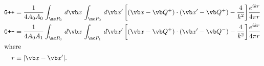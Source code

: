 $$\begin{align*}
\texttt{G++}&=\frac{1}{4A_0 A_0}
\int_{\mc P_0} \, d\vb x \, 
\int_{\mc P_0} \, d\vb x^\prime \,
 \bigg[ (\vb x -\vb Q^+) \cdot (\vb x^\prime -\vb Q^+) - \frac{4}{k^2}\bigg]
 \frac{e^{ikr}}{4\pi r}
\\
\texttt{G+-}&=\frac{1}{4A_0 A_1}
\int_{\mc P_0} \, d\vb x \, 
\int_{\mc P_1} \, d\vb x^\prime \,
 \bigg[ (\vb x -\vb Q^+) \cdot (\vb x^\prime -\vb Q^-) - \frac{4}{k^2}\bigg]
 \frac{e^{ikr}}{4\pi r}
\\
\intertext{where}
r&\equiv |\vb x - \vb x^\prime|.
\end{align*}$$

